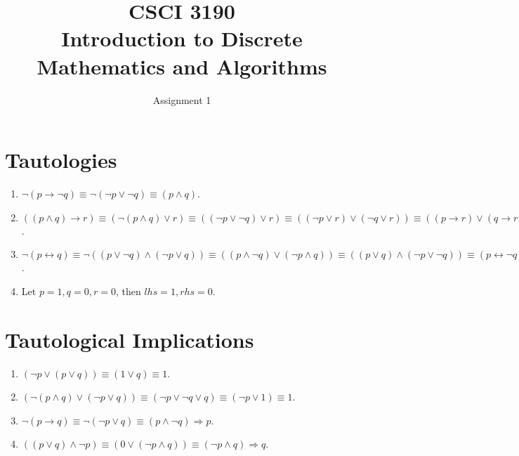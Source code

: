 \documentclass[sigconf]{acmart}
\begin{document}
\title{CSCI 3190 \\ Introduction to Discrete Mathematics and Algorithms}
\subtitle{Assignment 1}


%
%



\maketitle

%
\section{Tautologies}
\begin{enumerate}
	\item $\neg (p \to \neg q) \equiv \neg (\neg p \lor \neg q) \equiv (p \land q)$.
	\item $((p \land q) \to r) \equiv (\neg (p \land q) \lor r) \equiv ((\neg p \lor \neg q) \lor r) \equiv ((\neg p \lor r) \lor (\neg q \lor r)) \equiv ((p \to r) \lor (q \to r))$.
	\item $\neg (p \leftrightarrow q) \equiv \neg ((p \lor \neg q) \land (\neg p \lor q)) \equiv ((p \land \neg q) \lor (\neg p \land q)) \equiv ((p \lor q) \land (\neg p \lor \neg q)) \equiv (p \leftrightarrow \neg q)$.
	\item Let $p = 1, q = 0, r = 0$, then $lhs = 1, rhs = 0$.
\end{enumerate}

\section{Tautological Implications}
\begin{enumerate}
	\item $(\neg p \lor (p \lor q)) \equiv (1 \lor q) \equiv 1$.
	\item $(\neg(p \land q) \lor (\neg p \lor q)) \equiv (\neg p \lor \neg q \lor q) \equiv (\neg p \lor 1) \equiv 1$.
	\item $\neg (p \to q) \equiv \neg (\neg p \lor q) \equiv (p \land \neg q) \Rightarrow p$.
	\item $((p \lor q) \land \neg p) \equiv (0 \lor (\neg p \land q)) \equiv (\neg p \land q) \Rightarrow q$.
\end{enumerate}
\end{document}
